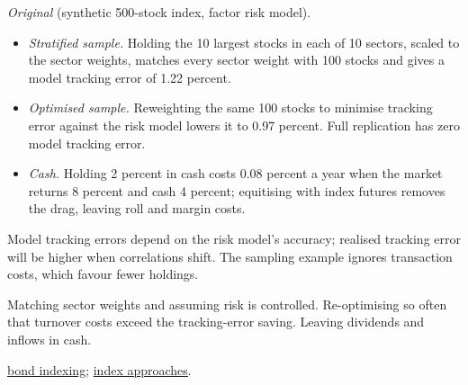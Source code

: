 \begin{qfmethod}
 \emph{Original} (synthetic 500-stock index, factor risk model).
\begin{itemize}
\item \emph{Stratified sample.} Holding the 10 largest stocks in each of 10 sectors, scaled to the sector weights, matches every sector weight with 100 stocks and gives a model tracking error of 1.22 percent.
\item \emph{Optimised sample.} Reweighting the same 100 stocks to minimise tracking error against the risk model lowers it to 0.97 percent. Full replication has zero model tracking error.
\item \emph{Cash.} Holding 2 percent in cash costs 0.08 percent a year when the market returns 8 percent and cash 4 percent; equitising with index futures removes the drag, leaving roll and margin costs.
\end{itemize}

 Model tracking errors depend on the risk model's accuracy; realised tracking error will be higher when correlations shift. The sampling example ignores transaction costs, which favour fewer holdings.

 Matching sector weights and assuming risk is controlled. Re-optimising so often that turnover costs exceed the tracking-error saving. Leaving dividends and inflows in cash.

 \hyperref[meth:bond-index-exposure-benchmarks]{bond indexing}; \hyperref[def:cap-weighted-factor-indexing]{index approaches}.

\end{qfmethod}

